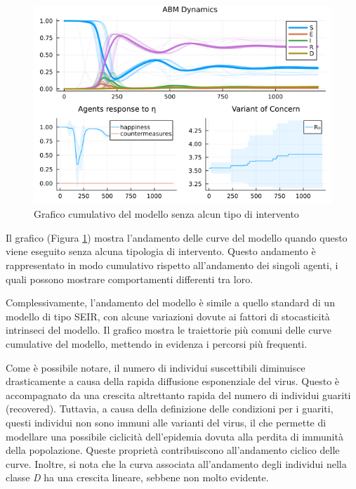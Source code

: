 \begin{figure}[H]
    \begin{center}
		\includegraphics[width=\textwidth]{img/SocialNetworkABM_NO_CONTROL.png}
		\caption{Grafico cumulativo del modello senza alcun tipo di intervento}
		\label{fig:abm_no_intervent}
	\end{center}
\end{figure}

Il grafico (Figura \ref{fig:abm_no_intervent}) mostra 
l'andamento delle curve del modello quando questo viene eseguito 
senza alcuna tipologia di intervento. Questo andamento è rappresentato 
in modo cumulativo rispetto all'andamento dei singoli agenti, 
i quali possono mostrare comportamenti differenti tra loro.

Complessivamente, l'andamento del modello è simile a quello 
standard di un modello di tipo SEIR, con alcune variazioni 
dovute ai fattori di stocasticità intrinseci del modello. 
Il grafico mostra le traiettorie più comuni delle curve cumulative 
del modello, mettendo in evidenza i percorsi più frequenti.

Come è possibile notare, il numero di individui suscettibili 
diminuisce drasticamente a causa della rapida diffusione 
esponenziale del virus. Questo è accompagnato da una crescita 
altrettanto rapida del numero di individui guariti (recovered). 
Tuttavia, a causa della definizione delle condizioni per i guariti, 
questi individui non sono immuni alle varianti del virus, il che 
permette di modellare una possibile ciclicità dell'epidemia 
dovuta alla perdita di immunità della popolazione. 
Queste proprietà contribuiscono all'andamento ciclico delle curve. 
Inoltre, si nota che la curva associata all'andamento degli 
individui nella classe \emph{D} ha una crescita lineare, 
sebbene non molto evidente.

